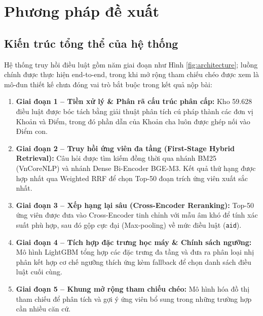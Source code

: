 \documentclass[12pt,a4paper]{article}
\begin{document}
\section{Phương pháp đề xuất}

\subsection{Kiến trúc tổng thể của hệ thống}
Hệ thống truy hồi điều luật gồm năm giai đoạn như Hình \ref{fig:architecture}; luồng chính được thực hiện end-to-end, trong khi mở rộng tham chiếu chéo được xem là mô-đun thiết kế chưa đóng vai trò bắt buộc trong kết quả nộp bài:
\begin{enumerate}[leftmargin=0.7cm]
    \item \textbf{Giai đoạn 1 -- Tiền xử lý \& Phân rã cấu trúc phân cấp:} Kho 59.628 điều luật được bóc tách bằng giải thuật phân tích cú pháp thành các đơn vị Khoản và Điểm, trong đó phần dẫn của Khoản cha luôn được ghép nối vào Điểm con.
    \item \textbf{Giai đoạn 2 -- Truy hồi ứng viên đa tầng (First-Stage Hybrid Retrieval):} Câu hỏi được tìm kiếm đồng thời qua nhánh BM25 (VnCoreNLP) và nhánh Dense Bi-Encoder BGE-M3. Kết quả thứ hạng được hợp nhất qua Weighted RRF để chọn Top-50 đoạn trích ứng viên xuất sắc nhất.
    \item \textbf{Giai đoạn 3 -- Xếp hạng lại sâu (Cross-Encoder Reranking):} Top-50 ứng viên được đưa vào Cross-Encoder tinh chỉnh với mẫu âm khó để tính xác suất phù hợp, sau đó gộp cực đại (Max-pooling) về mức điều luật (\texttt{aid}).
    \item \textbf{Giai đoạn 4 -- Tích hợp đặc trưng học máy \& Chính sách ngưỡng:} Mô hình LightGBM tổng hợp các đặc trưng đa tầng và đưa ra phân loại nhị phân kết hợp cơ chế ngưỡng thích ứng kèm fallback để chọn danh sách điều luật cuối cùng.
    \item \textbf{Giai đoạn 5 -- Khung mở rộng tham chiếu chéo:} Mô hình hóa đồ thị tham chiếu để phân tích và gợi ý ứng viên bổ sung trong những trường hợp cần nhiều căn cứ.
\end{enumerate}
\end{document}
